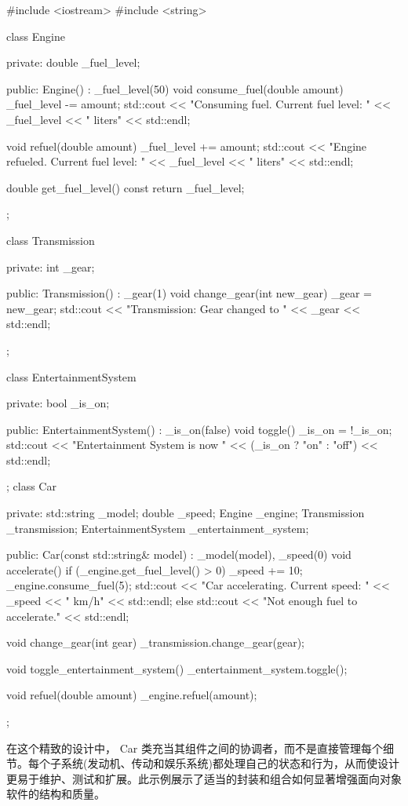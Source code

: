 \begin{cpp}
#include <iostream>
#include <string>

class Engine {
private:
    double _fuel_level;

public:
    Engine() : _fuel_level(50) {}
    void consume_fuel(double amount) {
        _fuel_level -= amount;
        std::cout << "Consuming fuel. Current fuel level: " << _fuel_level << " liters" << std::endl;
    }

    void refuel(double amount) {
        _fuel_level += amount;
        std::cout << "Engine refueled. Current fuel level: " << _fuel_level << " liters" << std::endl;
    }

    double get_fuel_level() const {
        return _fuel_level;
    }
};

class Transmission {
private:
    int _gear;

public:
    Transmission() : _gear(1) {}
    void change_gear(int new_gear) {
        _gear = new_gear;
        std::cout << "Transmission: Gear changed to " << _gear << std::endl;
    }
};

class EntertainmentSystem {
private:
    bool _is_on;

public:
    EntertainmentSystem() : _is_on(false) {}
    void toggle() {
        _is_on = !_is_on;
        std::cout << "Entertainment System is now " << (_is_on ? "on"
        : "off") << std::endl;
    }
};
class Car {
private:
    std::string _model;
    double _speed;
    Engine _engine;
    Transmission _transmission;
    EntertainmentSystem _entertainment_system;

public:
    Car(const std::string& model) : _model(model), _speed(0) {}
    void accelerate() {
        if (_engine.get_fuel_level() > 0) {
            _speed += 10;
            _engine.consume_fuel(5);
            std::cout << "Car accelerating. Current speed: " << _speed << " km/h" << std::endl;
        } else {
            std::cout << "Not enough fuel to accelerate." <<
            std::endl;
        }
    }

    void change_gear(int gear) {
        _transmission.change_gear(gear);
    }

    void toggle_entertainment_system() {
        _entertainment_system.toggle();
    }

    void refuel(double amount) {
        _engine.refuel(amount);
    }
};
\end{cpp}

在这个精致的设计中， Car 类充当其组件之间的协调者，而不是直接管理每个细节。每个子系统(发动机、传动和娱乐系统)都处理自己的状态和行为，从而使设计更易于维护、测试和扩展。此示例展示了适当的封装和组合如何显著增强面向对象软件的结构和质量。

